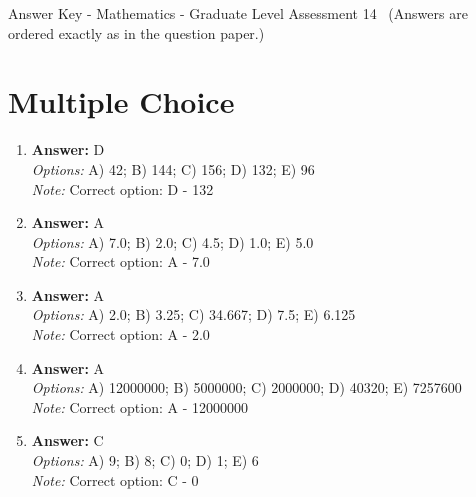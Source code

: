 \documentclass[12pt]{article}
\begin{document}
\begin{center}
Answer Key - Mathematics - Graduate Level Assessment 14 \
\small (Answers are ordered exactly as in the question paper.)
\end{center}

\section*{Multiple Choice}
\begin{enumerate}[label=\arabic*.]
\item \textbf{Answer:} D
\\ \textit{Options:} A) 42; B) 144; C) 156; D) 132; E) 96
\\ \textit{Note:} Correct option: D - 132
\item \textbf{Answer:} A
\\ \textit{Options:} A) 7.0; B) 2.0; C) 4.5; D) 1.0; E) 5.0
\\ \textit{Note:} Correct option: A - 7.0
\item \textbf{Answer:} A
\\ \textit{Options:} A) 2.0; B) 3.25; C) 34.667; D) 7.5; E) 6.125
\\ \textit{Note:} Correct option: A - 2.0
\item \textbf{Answer:} A
\\ \textit{Options:} A) 12000000; B) 5000000; C) 2000000; D) 40320; E) 7257600
\\ \textit{Note:} Correct option: A - 12000000
\item \textbf{Answer:} C
\\ \textit{Options:} A) 9; B) 8; C) 0; D) 1; E) 6
\\ \textit{Note:} Correct option: C - 0
\end{enumerate}
\end{document}
